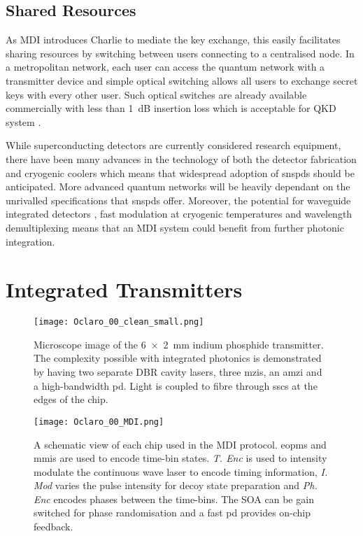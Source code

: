 \subsection{Shared Resources}

As \ac{MDI} introduces Charlie to mediate the key exchange, this easily facilitates sharing resources by switching between users connecting to a centralised node. In a metropolitan network, each user can access the quantum network with a transmitter device and simple optical switching allows all users to exchange secret keys with every other user. Such optical switches are already available commercially with less than \SI{1}{dB} insertion loss which is acceptable for \ac{QKD} system \cite{polatis}. 

While superconducting detectors are currently considered research equipment, there have been many advances in the technology of both the detector fabrication and cryogenic coolers which means that widespread adoption of \acp{snspd} should be anticipated. More advanced quantum networks will be heavily dependant on the unrivalled specifications that \acp{snspd} offer. Moreover, the potential for waveguide integrated detectors \cite{sprengers2011, vetter2016, yun2019}, fast modulation at cryogenic temperatures \cite{eltes2019} and wavelength demultiplexing \cite{sugita2000} means that an \ac{MDI} system could benefit from further photonic integration. 

\section{Integrated Transmitters}

\begin{figure}[t]
	\centering
	\texttt{[image: Oclaro\_00\_clean\_small.png]}
	\caption[Microscope image of the InP QKD transmitter devices]{Microscope image of the \SI{6x2}{mm} indium phosphide transmitter. The complexity possible with integrated photonics is demonstrated by having two separate \ac{DBR} cavity lasers, three \acfp{mzi}, an \ac{amzi} and a high-bandwidth \acf{pd}. Light is coupled to fibre through \acfp{ssc} at the edges of the chip.}
	\label{fig:oclaro_00}
\end{figure}

\begin{figure}[t]
	\texttt{[image: Oclaro\_00\_MDI.png]}
	\caption[InP transmitter schematic for BB84 state generation]{A schematic view of each chip used in the \acs{MDI} protocol. \Acfp{eopm} and \acfp{mmi} are used to encode time-bin states. \textit{T. Enc} is used to intensity modulate the continuous wave laser to encode timing information, \textit{I. Mod} varies the pulse intensity for decoy state preparation and \textit{Ph. Enc} encodes phases between the time-bins. The \acf{SOA} can be gain switched for phase randomisation and a fast \acf{pd} provides on-chip feedback.}
	\label{fig:chip_mdi_schematic}
\end{figure}

